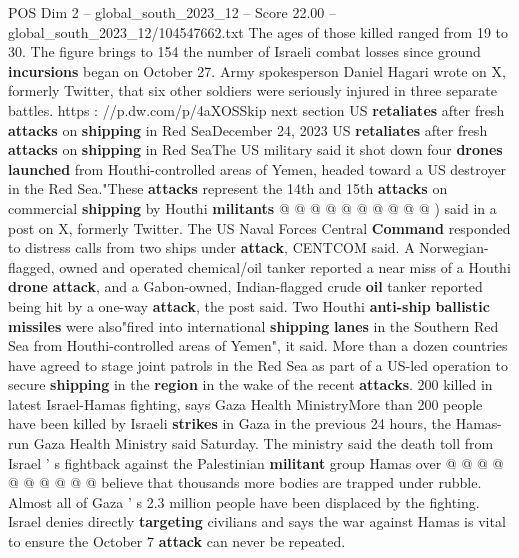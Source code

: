 \begin{textsample}{POS Dim 2 – global\_south\_2023\_12 – Score 22.00 – global\_south\_2023\_12/104547662.txt}
The ages of those killed ranged from 19 to 30.
The figure brings to 154 the number of Israeli combat losses since ground \textbf{incursions} began on October 27.
Army spokesperson Daniel Hagari wrote on X, formerly Twitter, that six other soldiers were seriously injured in three separate battles. https : //p.dw.com/p/4aXOSSkip next section US \textbf{retaliates} after fresh \textbf{attacks} on \textbf{shipping} in Red SeaDecember 24, 2023 US \textbf{retaliates} after fresh \textbf{attacks} on \textbf{shipping} in Red SeaThe US military said it shot down four \textbf{drones} \textbf{launched} from Houthi-controlled areas of Yemen, headed toward a US destroyer in the Red Sea."These \textbf{attacks} represent the 14th and 15th \textbf{attacks} on commercial \textbf{shipping} by Houthi \textbf{militants} @ @ @ @ @ @ @ @ @ @ ) said in a post on X, formerly Twitter.
The US Naval Forces Central \textbf{Command} responded to distress calls from two ships under \textbf{attack}, CENTCOM said.
A Norwegian-flagged, owned and operated chemical/oil tanker reported a near miss of a Houthi \textbf{drone} \textbf{attack}, and a Gabon-owned, Indian-flagged crude \textbf{oil} tanker reported being hit by a one-way \textbf{attack}, the post said.
Two Houthi \textbf{anti-ship} \textbf{ballistic} \textbf{missiles} were also"fired into international \textbf{shipping} \textbf{lanes} in the Southern Red Sea from Houthi-controlled areas of Yemen", it said.
More than a dozen countries have agreed to stage joint patrols in the Red Sea as part of a US-led operation to secure \textbf{shipping} in the \textbf{region} in the wake of the recent \textbf{attacks}. 200 killed in latest Israel-Hamas fighting, says Gaza Health MinistryMore than 200 people have been killed by Israeli \textbf{strikes} in Gaza in the previous 24 hours, the Hamas-run Gaza Health Ministry said Saturday.
The ministry said the death toll from Israel ' s fightback against the Palestinian \textbf{militant} group Hamas over @ @ @ @ @ @ @ @ @ @ believe that thousands more bodies are trapped under rubble.
Almost all of Gaza ' s 2.3 million people have been displaced by the fighting.
Israel denies directly \textbf{targeting} civilians and says the war against Hamas is vital to ensure the October 7 \textbf{attack} can never be repeated.

\end{textsample}

